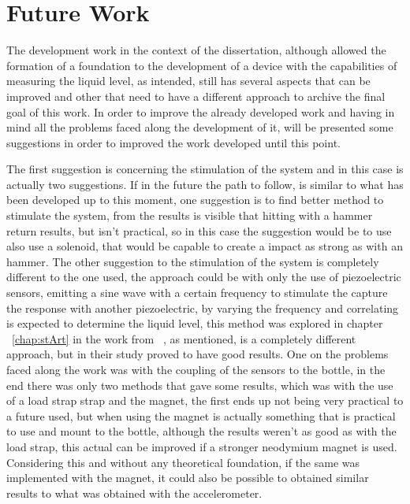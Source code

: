 \section{Future Work}
The development work in the context of the dissertation, although allowed the formation of a foundation to the development of a device with the capabilities of measuring the liquid level, as intended, still has several aspects that can be improved and other that need to have a different approach to archive the final goal of this work. In order to improve the already developed work and having in mind all the problems faced along the development of it, will be presented some suggestions in order to improved the work developed until this point. 

The first suggestion is concerning the stimulation of the system and in this case is actually two suggestions. If in the future the path to follow, is similar to what has been developed up to this moment, one suggestion is to find better method to stimulate the system, from the results is visible that hitting with a hammer return results, but isn't practical, so in this case the suggestion would be to use also use a solenoid, that would be capable to create a impact as strong as with an hammer. The other suggestion to the stimulation of the system is completely different to the one used, the approach could be with only the use of piezoelectric sensors, emitting a sine wave with a certain frequency to stimulate the capture the response with another piezoelectric, by varying the frequency and correlating is expected to determine the liquid level, this method was explored in chapter ~\ref{chap:stArt} in the work from ~\citeauthor{jahnLevelSensorFluids2014a}\cite{jahnLevelSensorFluids2014a}, as mentioned, is a completely different approach, but in their study proved to have good results.   
One on the problems faced along the work was with the coupling of the sensors to the bottle, in the end there was only two methods that gave some results, which was with the use of a load strap strap and the magnet, the first ends up not being very practical to a future used, but when using the magnet is actually something that is practical to use and mount to the bottle, although the results weren't as good as with the load strap, this actual can be improved if a stronger neodymium magnet is used. Considering this and without any theoretical foundation, if the same was implemented with the magnet, it could also be possible to obtained similar results to what was obtained with the accelerometer.

